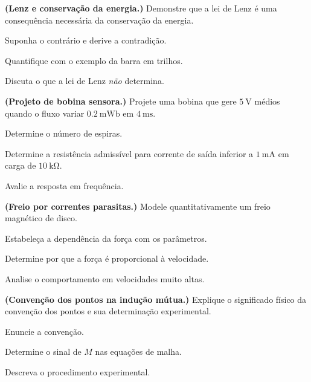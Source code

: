 \blocodesafio
\begin{questao}[4]{}

\textbf{(Lenz e conservação da energia.)} Demonstre que a lei de Lenz é uma
consequência necessária da conservação da energia.
\begin{itensq}
\item Suponha o contrário e derive a contradição.
\item Quantifique com o exemplo da barra em trilhos.
\item Discuta o que a lei de Lenz \emph{não} determina.
\end{itensq}


\end{questao}
\begin{questao}[4]{}

\textbf{(Projeto de bobina sensora.)} Projete uma bobina que gere
$\SI{5}{\volt}$ médios quando o fluxo variar $\SI{0.2}{\milli\weber}$ em
$\SI{4}{\milli\second}$.
\begin{itensq}
\item Determine o número de espiras.
\item Determine a resistência admissível para corrente de saída inferior a
      $\SI{1}{\milli\ampere}$ em carga de $\SI{10}{\kilo\ohm}$.
\item Avalie a resposta em frequência.
\end{itensq}


\end{questao}
\begin{questao}[4]{}

\textbf{(Freio por correntes parasitas.)} Modele quantitativamente um freio
magnético de disco.
\begin{itensq}
\item Estabeleça a dependência da força com os parâmetros.
\item Determine por que a força é proporcional à velocidade.
\item Analise o comportamento em velocidades muito altas.
\end{itensq}


\end{questao}
\begin{questao}[4]{}

\textbf{(Convenção dos pontos na indução mútua.)} Explique o significado físico
da convenção dos pontos e sua determinação experimental.
\begin{itensq}
\item Enuncie a convenção.
\item Determine o sinal de $M$ nas equações de malha.
\item Descreva o procedimento experimental.
\end{itensq}


\end{questao}
